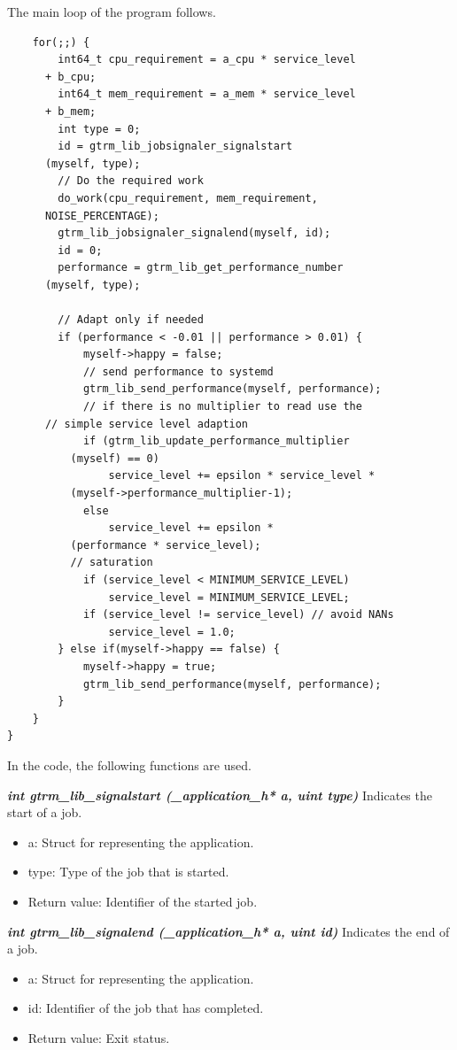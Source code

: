 \documentclass[nobiblatex]{LTHthesis}
\begin{document}
The main loop of the program follows.

\begin{lstlisting}
	for(;;) {		
		int64_t cpu_requirement = a_cpu * service_level 
	  + b_cpu;
		int64_t mem_requirement = a_mem * service_level 
	  + b_mem;
		int type = 0;
		id = gtrm_lib_jobsignaler_signalstart
	  (myself, type);		
		// Do the required work	
		do_work(cpu_requirement, mem_requirement, 
	  NOISE_PERCENTAGE);	
		gtrm_lib_jobsignaler_signalend(myself, id);
		id = 0;										
		performance = gtrm_lib_get_performance_number
	  (myself, type);
		
		// Adapt only if needed
		if (performance < -0.01 || performance > 0.01) {
			myself->happy = false;					
			// send performance to systemd
			gtrm_lib_send_performance(myself, performance);					
			// if there is no multiplier to read use the 
	  // simple service level adaption
			if (gtrm_lib_update_performance_multiplier
		  (myself) == 0)
				service_level += epsilon * service_level *
		  (myself->performance_multiplier-1);
			else
				service_level += epsilon * 
		  (performance * service_level);	
		  // saturation											
			if (service_level < MINIMUM_SERVICE_LEVEL)
				service_level = MINIMUM_SERVICE_LEVEL;
			if (service_level != service_level) // avoid NANs
				service_level = 1.0;
		} else if(myself->happy == false) {			
			myself->happy = true;
			gtrm_lib_send_performance(myself, performance);
		}	
	}	
}
\end{lstlisting}

In the code, the following functions are used.
\begin{framed}
	\begin{flushleft}		
		\emph{\textbf{{int gtrm\_lib\_signalstart
	  (\_application\_h* a, uint type)}}} \newline
				Indicates the start of a job.
				\begin{itemize}
				\item a: Struct for representing the application.
				\item type: Type of the job that is started.
				\item Return value: Identifier of the started job.
				\end{itemize}
	\end{flushleft}
\end{framed}


\begin{framed}
	\begin{flushleft}	
			\emph{\textbf{{int gtrm\_lib\_signalend
		(\_application\_h* a, uint id)}}} \newline
			Indicates the end of a job.
			\begin{itemize}
			\item a: Struct for representing the application.
			\item id: Identifier of the job that has completed.
			\item Return value: Exit status.
			\end{itemize}
	\end{flushleft}
\end{framed}
\end{document}
